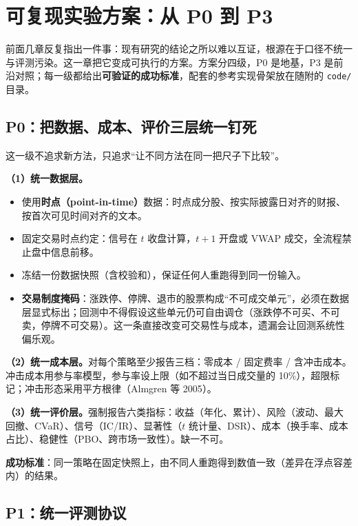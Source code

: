 \section{可复现实验方案：从 P0 到 P3}\label{sec:repro_protocol}

前面几章反复指出一件事：现有研究的结论之所以难以互证，根源在于口径不统一与评测污染。这一章把它变成可执行的方案。方案分四级，P0 是地基，P3 是前沿对照；每一级都给出\textbf{可验证的成功标准}，配套的参考实现骨架放在随附的 \texttt{code/} 目录。

\subsection{P0：把数据、成本、评价三层统一钉死}

这一级不追求新方法，只追求“让不同方法在同一把尺子下比较”。

\textbf{（1）统一数据层。}
\begin{itemize}
  \item 使用\textbf{时点（point-in-time）}数据：时点成分股、按实际披露日对齐的财报、按首次可见时间对齐的文本。
  \item 固定交易时点约定：信号在 $t$ 收盘计算，$t+1$ 开盘或 VWAP 成交，全流程禁止盘中信息前移。
  \item 冻结一份数据快照（含校验和），保证任何人重跑得到同一份输入。
  \item \textbf{交易制度掩码}：涨跌停、停牌、退市的股票构成“不可成交单元”，必须在数据层显式标出；回测中不得假设这些单元仍可自由调仓（涨跌停不可买、不可卖，停牌不可交易）。这一条直接改变可交易性与成本，遗漏会让回测系统性偏乐观。
\end{itemize}

\textbf{（2）统一成本层。}对每个策略至少报告三档：零成本 / 固定费率 / 含冲击成本。冲击成本用参与率模型，参与率设上限（如不超过当日成交量的 10\%），超限标记；冲击形态采用平方根律（Almgren 等 2005\cite{almgren2005}）。

\textbf{（3）统一评价层。}强制报告六类指标：收益（年化、累计）、风险（波动、最大回撤、CVaR）、信号（IC/IR）、显著性（$t$ 统计量、DSR）、成本（换手率、成本占比）、稳健性（PBO、跨市场一致性）。缺一不可。

\textbf{成功标准}：同一策略在固定快照上，由不同人重跑得到数值一致（差异在浮点容差内）的结果。

\subsection{P1：统一评测协议}

